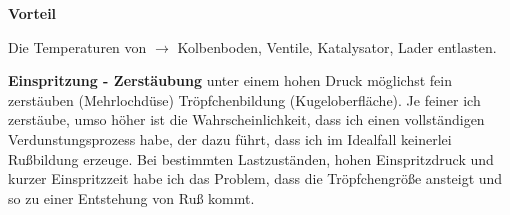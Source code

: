 \textbf{Vorteil}

Die Temperaturen von $\to$ Kolbenboden, Ventile, Katalysator, Lader
entlasten.

\textbf{Einspritzung - Zerstäubung} unter einem hohen Druck möglichst
fein zerstäuben (Mehrlochdüse) Tröpfchenbildung (Kugeloberfläche). Je
feiner ich zerstäube, umso höher ist die Wahrscheinlichkeit, dass ich
einen vollständigen Verdunstungsprozess habe, der dazu führt, dass ich
im Idealfall keinerlei Rußbildung erzeuge. Bei bestimmten Lastzuständen,
hohen Einspritzdruck und kurzer Einspritzzeit habe ich das Problem, dass
die Tröpfchengröße ansteigt und so zu einer Entstehung von Ruß kommt.
